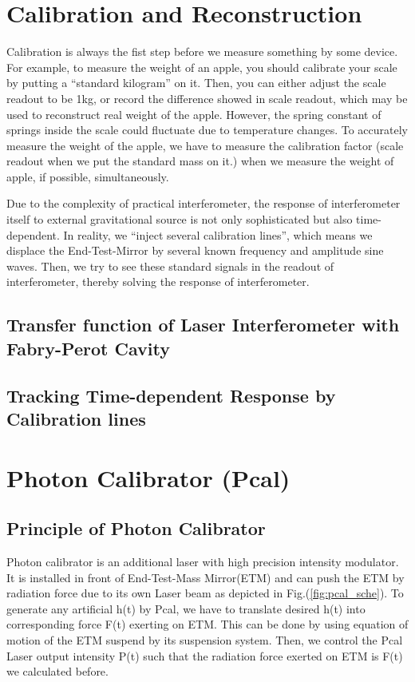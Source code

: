 \section{Calibration and Reconstruction}

Calibration is always the fist step before we measure something by some device.
For example, to measure the weight of an apple, you should calibrate your scale by putting a “standard kilogram” on it. Then, you can either adjust the scale readout to be 1kg, or record the difference showed in scale readout, which may be used to reconstruct real weight of the apple. However, the spring constant of springs inside the scale could fluctuate due to temperature changes. To accurately measure the weight of the apple, we have to measure the calibration factor (scale readout when we put the standard mass on it.) when we measure the weight of apple, if possible, simultaneously.

Due to the complexity of practical interferometer, the response of interferometer itself to external gravitational source is not only sophisticated but also time-dependent. In reality, we “inject several calibration lines”, which means we displace the End-Test-Mirror by several known frequency and amplitude sine waves. Then, we try to see these standard signals in the readout of interferometer, thereby solving the response of interferometer.

\subsection{Transfer function of Laser Interferometer with Fabry-Perot Cavity}


\subsection{Tracking Time-dependent Response by Calibration lines}



\section{Photon Calibrator (Pcal)}
\subsection{Principle of Photon Calibrator}
\label{sec:pcalth}
Photon calibrator is an additional laser with high precision intensity modulator. It is installed in front of End-Test-Mass Mirror(ETM) and can push the ETM by radiation force due to its own Laser beam as depicted in Fig.(\ref{fig:pcal_sche}). To generate any artificial h(t) by Pcal, we have to translate desired h(t) into corresponding force F(t) exerting on ETM. This can be done by using equation of motion of the ETM suspend by its suspension system. Then, we control the Pcal Laser output intensity P(t) such that the radiation force exerted on ETM is F(t) we calculated before. 

